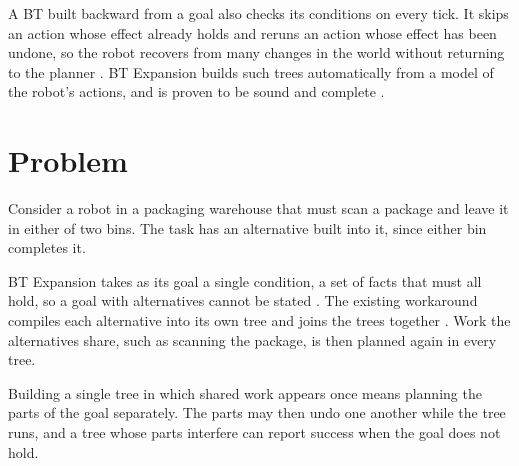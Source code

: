     A BT built backward from a goal also checks its conditions on every tick.
    It skips an action whose effect already holds and reruns an action whose effect has been undone, so the robot recovers from many changes in the world without returning to the planner \cite{colledanchise2019pabt}.
    BT Expansion builds such trees automatically from a model of the robot's actions, and is proven to be sound and complete \cite{cai2021}.

\section{Problem}
\label{sec:problem}
    Consider a robot in a packaging warehouse that must scan a package and leave it in either of two bins.
    The task has an alternative built into it, since either bin completes it.

    BT Expansion takes as its goal a single condition, a set of facts that must all hold, so a goal with alternatives cannot be stated \cite{cai2021}.
    The existing workaround compiles each alternative into its own tree and joins the trees together \cite{chen2024}.
    Work the alternatives share, such as scanning the package, is then planned again in every tree.

    Building a single tree in which shared work appears once means planning the parts of the goal separately.
    The parts may then undo one another while the tree runs, and a tree whose parts interfere can report success when the goal does not hold.


